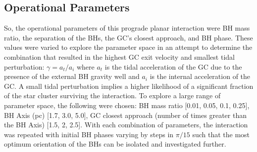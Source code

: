 \documentclass{aastex62}
\begin{document}
\subsection{Operational Parameters}
So, the operational parameters of this prograde planar interaction were BH mass ratio, the separation of the BHs, the GC's closest approach, and BH phase. These values were varied to explore the parameter space in an attempt to determine the combination that resulted in the highest GC exit velocity and smallest tidal perturbation: $\gamma = {a_{t}}/{a_i}$ where $a_{t}$ is the tidal acceleration of the GC due to the presence of the external BH gravity well and $a_{i}$ is the internal acceleration of the GC. A small tidal perturbation implies a higher likelihood of a significant fraction of the star cluster surviving the interaction. To explore a large range of parameter space, the following were chosen: BH mass ratio [0.01, 0.05, 0.1, 0.25], BH Axis (pc) [1.7, 3.0, 5.0], GC closest approach (number of times greater than the BH Axis) [1.5, 2, 2.5]. With each combination of parameters, the interaction was repeated with initial BH phases varying by steps in $\pi/15$ such that the most optimum orientation of the BHs can be isolated and investigated further. 
\end{document}

